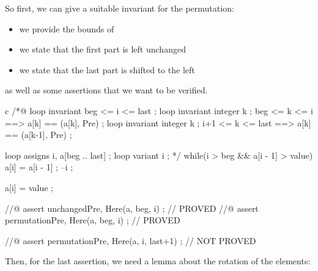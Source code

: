 So first, we can give a suitable invariant for the permutation:

\begin{itemize}
\item we provide the bounds of 
\item we state that the first part is left unchanged
\item we state that the last part is shifted to the left
\end{itemize}

as well as some assertions that we want to be verified.



\begin{CodeBlock}{c}
  /*@
    loop invariant beg <= i <= last ;
    loop invariant \forall integer k ; beg <= k <= i    ==> a[k] == \at(a[k], Pre) ;
    loop invariant \forall integer k ; i+1 <= k <= last ==> a[k] == \at(a[k-1], Pre) ;

    loop assigns i, a[beg .. last] ;
    loop variant i ;
  */
  while(i > beg && a[i - 1] > value){
    a[i] = a[i - 1] ;
    --i ;
  }

  a[i] = value ;

  //@ assert unchanged{Pre, Here}(a, beg, i) ;   // PROVED
  //@ assert permutation{Pre, Here}(a, beg, i) ; // PROVED

  //@ assert permutation{Pre, Here}(a, i, last+1) ; // NOT PROVED
\end{CodeBlock}


Then, for the last assertion, we need a lemma about the rotation of the
elements:





